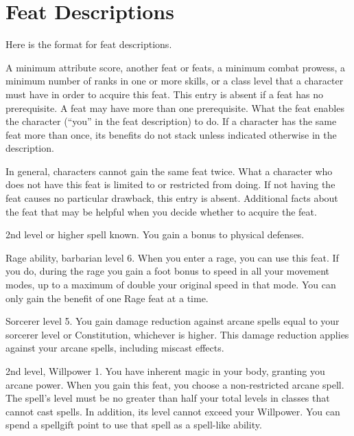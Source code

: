 \twocolumn

\section{Feat Descriptions}
Here is the format for feat descriptions.

\featpre A minimum attribute score, another feat or feats, a minimum combat prowess, a minimum number of ranks in one or more skills, or a class level that a character must have in order to acquire this feat.
This entry is absent if a feat has no prerequisite.
A feat may have more than one prerequisite.
\featben What the feat enables the character (``you'' in the feat description) to do.
If a character has the same feat more than once, its benefits do not stack unless indicated otherwise in the description.
\par In general, characters cannot gain the same feat twice.
What a character who does not have this feat is limited to or restricted from doing.
If not having the feat causes no particular drawback, this entry is absent.
Additional facts about the feat that may be helpful when you decide whether to acquire the feat.

\featpre 2nd level or higher  spell known.
\featben You gain a  bonus to physical defenses.

\featpre Rage ability, barbarian level 6.
\featben When you enter a rage, you can use this feat. If you do, during the rage you gain a  foot bonus to speed in all your movement modes, up to a maximum of double your original speed in that mode.
 You can only gain the benefit of one Rage feat at a time.

\featpre Sorcerer level 5.
\featben You gain damage reduction against arcane spells equal to your sorcerer level or Constitution, whichever is higher.
This damage reduction applies against your arcane spells, including miscast effects.

\featpres 2nd level, Willpower 1.
\featben You have inherent magic in your body, granting you arcane power.
When you gain this feat, you choose a non-restricted arcane spell.
The spell's level must be no greater than half your total levels in classes that cannot cast spells.
In addition, its level cannot exceed your Willpower.
You can spend a spellgift point to use that spell as a spell-like ability.

